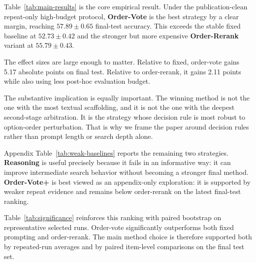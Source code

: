 \documentclass[11pt]{article}
\begin{document}
Table~\ref{tab:main-results} is the core empirical result. Under the publication-clean repeat-only high-budget protocol, \textbf{Order-Vote} is the best strategy by a clear margin, reaching $57.89 \pm 0.65$ final-test accuracy. This exceeds the stable fixed baseline at $52.73 \pm 0.42$ and the stronger but more expensive \textbf{Order-Rerank} variant at $55.79 \pm 0.43$.

The effect sizes are large enough to matter. Relative to fixed, order-vote gains 5.17 absolute points on final test. Relative to order-rerank, it gains 2.11 points while also using less post-hoc evaluation budget.

The substantive implication is equally important. The winning method is not the one with the most textual scaffolding, and it is not the one with the deepest second-stage arbitration. It is the strategy whose decision rule is most robust to option-order perturbation. That is why we frame the paper around decision rules rather than prompt length or search depth alone.

Appendix Table~\ref{tab:weak-baselines} reports the remaining two strategies. \textbf{Reasoning} is useful precisely because it fails in an informative way: it can improve intermediate search behavior without becoming a stronger final method. \textbf{Order-Vote+} is best viewed as an appendix-only exploration: it is supported by weaker repeat evidence and remains below order-rerank on the latest final-test ranking.

\begin{table}[t]
\centering
\small
{}
\caption{Paired bootstrap on representative selected runs for the final test set.}
\label{tab:significance}
\end{table}


Table~\ref{tab:significance} reinforces this ranking with paired bootstrap on representative selected runs. Order-vote significantly outperforms both fixed prompting and order-rerank. The main method choice is therefore supported both by repeated-run averages and by paired item-level comparisons on the final test set.
\end{document}
